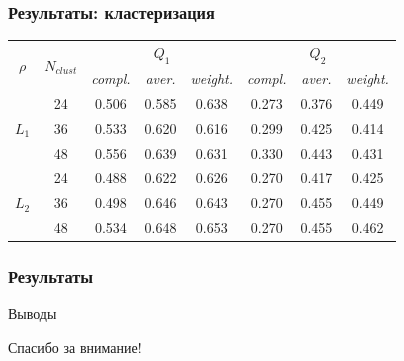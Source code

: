 \documentclass{beamer}
\begin{document}
\begin{frame}
    \frametitle{Результаты: кластеризация}   
    \begin{table}[h]
        \centering
        \begin{tabular}{c|c *{2}{|*{3}{c}}}
            \toprule
             &  &  &  \\
            \cmidrule(r){3-8}
            && \textit{compl.} & \textit{aver.} & \textit{weight.} & \textit{compl.} & \textit{aver.} & \textit{weight.} \\
            \midrule
                & 24    &   0.506  &   0.585 &    0.638  & 0.273   &  0.376    &   0.449  \\
                & 36    &   0.533  &   0.620 &    0.616  & 0.299   &  0.425    &   0.414  \\
                & 48    &   0.556  &   0.639 &    0.631  & 0.330   &  0.443    &   0.431  \\
        \midrule
                & 24    &   0.488  &   0.622 &    0.626  & 0.270   &  0.417    &   0.425  \\
                & 36    &   0.498  &   0.646 &    0.643  & 0.270   &  0.455    &   0.449  \\
                & 48    &   0.534  &   0.648 &    0.653  & 0.270   &  0.455    &   0.462  \\
        \bottomrule
        \end{tabular}
    \end{table}

\end{frame}


\begin{frame}
    \frametitle{Результаты}
    \begin{block}{Выводы}
        
    \end{block}
\end{frame}
    
\begin{frame}
    \begin{center}
        \Huge Спасибо за внимание!
    \end{center}
\end{frame}

\end{document}
